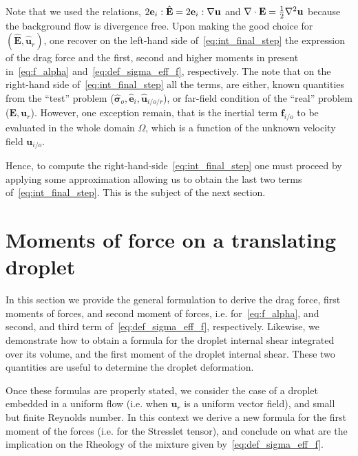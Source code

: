 Note that we used the relations, $2{\textbf{e}_i} : \hat{\textbf{E}} = 2{\textbf{e}_i} : {\mathbf{\nabla}\textbf{u}}$ and $\mathbf{\nabla}\cdot\textbf{E} = \frac{1}{2}\mathbf{\nabla}^2 \textbf{u}$ because the background flow is divergence free. 
Upon making the good choice for $(\hat{\textbf{E}}, \hat{\textbf{u}}_r)$, one recover on the left-hand side of~\ref{eq:int_final_step} the expression of the drag force and the first, second and higher moments in present in~\ref{eq:f_alpha} and~\ref{eq:def_sigma_eff_f}, respectively. 
The note that on the right-hand side of~\ref{eq:int_final_step} all the terms, are either, known quantities from the ``test'' problem ($\hat{\bm\sigma}_{o},\hat{\textbf{e}}_i, \hat{\textbf{u}}_{i/o/r}$), or far-field condition of the ``real'' problem ($\textbf{E},\textbf{u}_r$). 
However, one exception remain, that is the inertial term $\textbf{f}_{i/o}$ to be evaluated in the whole domain $\Omega$, which is a function of the unknown velocity field $\textbf{u}_{i/o}$. 

Hence, to compute the right-hand-side~\ref{eq:int_final_step} one must proceed by applying some approximation allowing us to obtain the last two terms of~\ref{eq:int_final_step}. 
This is the subject of the next section. 




\section{Moments of force on a translating droplet}

In this section we provide the general formulation to derive the drag force, first moments of forces, and second moment of forces, i.e. for~\ref{eq:f_alpha}, and second, and third term of~\ref{eq:def_sigma_eff_f}, respectively. 
Likewise, we demonstrate how to obtain a formula for the droplet internal shear integrated over its volume, and the first moment of the droplet internal shear.
These two quantities are useful to determine the droplet deformation.  

Once these formulas are properly stated, we consider the case of a droplet embedded in a uniform flow (i.e. when $\textbf{u}_r$ is a uniform vector field), and small but finite Reynolds number. 
In this context we derive a new formula for the first moment of the forces (i.e. for the Stresslet tensor), and conclude on what are the implication on the Rheology of the mixture given by~\ref{eq:def_sigma_eff_f}. 


